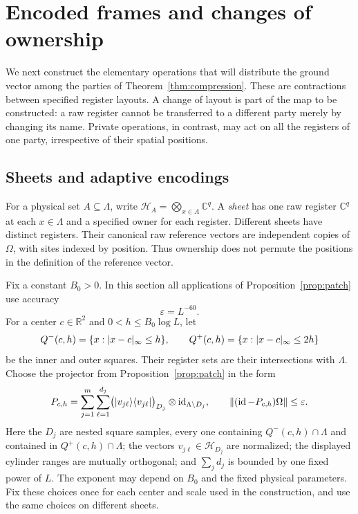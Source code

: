 \section{Encoded frames and changes of ownership}\label{sec:frames}

We next construct the elementary operations that will distribute the ground
vector among the parties of Theorem~\ref{thm:compression}.  These are
contractions between specified register layouts.  A change of layout is part
of the map to be constructed: a raw register cannot be transferred to a
different party merely by changing its name.  Private operations, in contrast,
may act on all the registers of one party, irrespective of their spatial
positions.

\subsection{Sheets and adaptive encodings}

For a physical set $A\subseteq\Lambda$, write
$\mathcal H_A=\bigotimes_{x\in A}\mathbb C^q$.  A \emph{sheet} has one raw
register $\mathbb C^q$ at each $x\in\Lambda$ and a specified owner for each
register.  Different sheets have distinct registers.  Their canonical raw
reference vectors are independent copies of $\Omega$, with sites indexed by
position.  Thus ownership does not permute the positions in the definition
of the reference vector.

Fix a constant $B_0>0$.  In this section all applications of
Proposition~\ref{prop:patch} use accuracy
\begin{equation}\label{eq:frame-epsilon}
 \varepsilon=L^{-60}.
\end{equation}
For a center $c\in\mathbb R^2$ and $0<h\le B_0\log L$, let
\[
 Q^-(c,h)=\{x:\lvert x-c\rvert_\infty\le h\},\qquad
 Q^+(c,h)=\{x:\lvert x-c\rvert_\infty\le 2h\}
\]
be the inner and outer squares.  Their register sets are their intersections
with $\Lambda$.  Choose the projector from Proposition~\ref{prop:patch} in
the form
\begin{equation}\label{eq:hole-projector}
 P_{c,h}
   =\sum_{j=1}^{m}\sum_{\ell=1}^{d_j}
       \bigl(|v_{j\ell}\rangle\langle v_{j\ell}|\bigr)_{D_j}
           \otimes\operatorname{id}_{\Lambda\setminus D_j},
 \qquad
 \lVert (\operatorname{id}-P_{c,h})\Omega\rVert\le\varepsilon.
\end{equation}
Here the $D_j$ are nested square samples, every one containing
$Q^-(c,h)\cap\Lambda$ and contained in $Q^+(c,h)\cap\Lambda$; the vectors
$v_{j\ell}\in\mathcal H_{D_j}$ are normalized; the displayed cylinder
ranges are mutually orthogonal; and $\sum_jd_j$ is bounded by one fixed
power of $L$.  The exponent may depend on $B_0$ and the fixed physical
parameters.  Fix these choices once for each center and scale used in the
construction, and use the same choices on different sheets.

